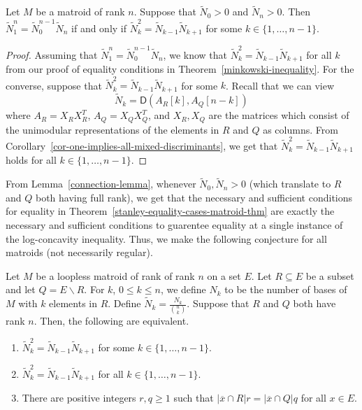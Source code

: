 \documentclass{puthesis-UG}
\begin{document}
\begin{lem} \label{connection-lemma}
	Let $M$ be a matroid of rank $n$. Suppose that $\widetilde{N}_0 > 0$ and $\widetilde{N}_n > 0$. Then $\widetilde{N}_1^n = \widetilde{N}_0^{n-1} \widetilde{N}_n$ if and only if $\widetilde{N}_k^2 = \widetilde{N}_{k-1} \widetilde{N}_{k+1}$ for some $k \in \{1, \ldots, n-1\}$.
\end{lem}

\begin{proof}
	Assuming that $\widetilde{N}_1^n = \widetilde{N}_0^{n-1} \widetilde{N}_n$, we know that $\widetilde{N}_k^2 = \widetilde{N}_{k-1} \widetilde{N}_{k+1}$ for all $k$ from our proof of equality conditions in Theorem~\ref{minkowski-inequality}. For the converse, suppose that $\widetilde{N}_k^2 = \widetilde{N}_{k-1} \widetilde{N}_{k+1}$ for some $k$. Recall that we can view 
	\[
		\widetilde{N}_k = \mathsf{D} (A_R [k], A_Q [n-k])
	\]
	where $A_R = X_R X_R^T$, $A_Q = X_Q X_Q^T$, and $X_R, X_Q$ are the matrices which consist of the unimodular representations of the elements in $R$ and $Q$ as columns. From Corollary~\ref{cor-one-implies-all-mixed-discriminants}, we get that $\widetilde{N}_k^2 = \widetilde{N}_{k-1} \widetilde{N}_{k+1}$ holds for all $k \in \{1, \ldots, n-1\}.$
\end{proof}

From Lemma~\ref{connection-lemma}, whenever $\widetilde{N}_0, \widetilde{N}_n > 0$ (which translate to $R$ and $Q$ both having full rank), we get that the necessary and sufficient conditions for equality in Theorem~\ref{stanley-equality-cases-matroid-thm} are exactly the necessary and sufficient conditions to guarentee equality at a single instance of the log-concavity inequality. Thus, we make the following conjecture for all matroids (not necessarily regular). 

\begin{conj} \label{matroid-conjecture}
	Let $M$ be a loopless matroid of rank of rank $n$ on a set $E$. Let $R \subseteq E$ be a subset and let $Q = E \backslash R$. For $k$, $0 \leq k \leq n$, we define $N_k$ to be the number of bases of $M$ with $k$ elements in $R$. Define $\widetilde{N}_k = \frac{N_k}{\binom{n}{k}}$. Suppose that $R$ and $Q$ both have rank $n$. Then, the following are equivalent. 
	\begin{enumerate}[label = (\alph*)]
		\item $\widetilde{N}_k^2 = \widetilde{N}_{k-1} \widetilde{N}_{k+1}$ for some $k \in \{1, \ldots, n-1\}$. 

		\item $\widetilde{N}_k^2 = \widetilde{N}_{k-1} \widetilde{N}_{k+1}$ for all $k \in \{1, \ldots, n-1\}$.

		\item There are positive integers $r, q \geq 1$ such that $|\overline{x} \cap R| r = |\overline{x} \cap Q| q$ for all $x \in E$. 
	\end{enumerate}
\end{conj}
\end{document}
